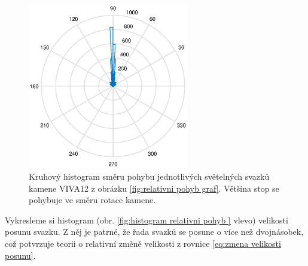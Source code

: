 \begin{figure}[h!]
\begin{center}
\includegraphics[width = 7cm]{figures/kruhovy_histogram.eps}
\end{center}
\caption{Kruhový histogram směru pohybu jednotlivých světelných svazků kamene VIVA12 z obrázku \ref{fig:relativni pohyb graf}. Většina stop se pohybuje ve směru rotace kamene.}
\label{fig:kruhovy histogram}
\end{figure}

Vykresleme si histogram (obr. \ref{fig:histogram relativni pohyb } vlevo) velikosti posunu svazku. Z něj je patrné, že řada svazků se posune o více než dvojnásobek, což potvrzuje teorii o relativní změně velikosti z rovnice \ref{eq:zmena velikosti posunu}. 

